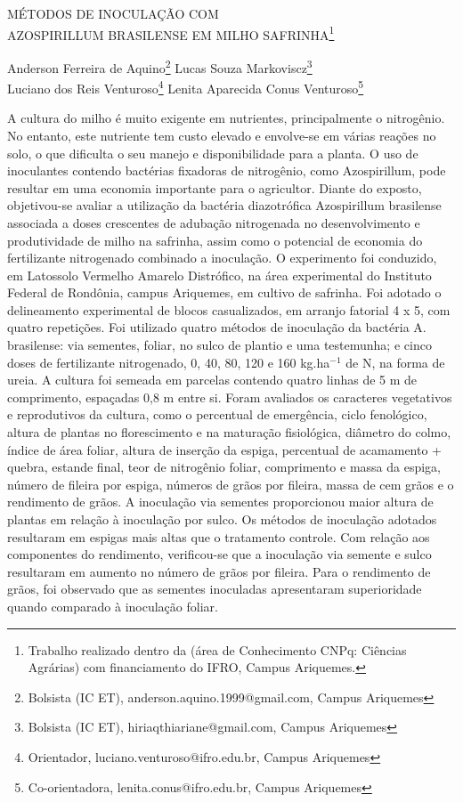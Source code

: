\documentclass[article,12pt,onesidea,4paper,english,brazil]{abntex2}
\begin{document}
	
	
	\frenchspacing 
	
	\begin{center}
		\LARGE MÉTODOS DE INOCULAÇÃO COM \\ \MakeUppercase{Azospirillum brasilense} EM MILHO		
		SAFRINHA\footnote{Trabalho realizado dentro da (área de Conhecimento CNPq: Ciências Agrárias) com financiamento
			do IFRO, Campus Ariquemes.}
		
		\normalsize
		Anderson Ferreira de Aquino\footnote{Bolsista (IC ET), anderson.aquino.1999@gmail.com, Campus Ariquemes} 
		Lucas Souza Markoviscz\footnote{Bolsista (IC ET), hiriaqthiariane@gmail.com, Campus Ariquemes} \\
		Luciano dos Reis Venturoso\footnote{Orientador, luciano.venturoso@ifro.edu.br, Campus Ariquemes} 
		Lenita Aparecida Conus Venturoso\footnote{Co-orientadora, lenita.conus@ifro.edu.br, Campus Ariquemes} 
	\end{center}
	
	\noindent A cultura do milho é muito exigente em nutrientes, principalmente o nitrogênio. No
	entanto, este nutriente tem custo elevado e envolve-se em várias reações no solo, o
	que dificulta o seu manejo e disponibilidade para a planta. O uso de inoculantes
	contendo bactérias fixadoras de nitrogênio, como Azospirillum, pode resultar em
	uma economia importante para o agricultor. Diante do exposto, objetivou-se avaliar a
	utilização da bactéria diazotrófica Azospirillum brasilense associada a doses
	crescentes de adubação nitrogenada no desenvolvimento e produtividade de milho
	na safrinha, assim como o potencial de economia do fertilizante nitrogenado
	combinado a inoculação. O experimento foi conduzido, em Latossolo Vermelho
	Amarelo Distrófico, na área experimental do Instituto Federal de Rondônia, campus
	Ariquemes, em cultivo de safrinha. Foi adotado o delineamento experimental de
	blocos casualizados, em arranjo fatorial 4 x 5, com quatro repetições. Foi utilizado
	quatro métodos de inoculação da bactéria A. brasilense: via sementes, foliar, no
	sulco de plantio e uma testemunha; e cinco doses de fertilizante nitrogenado, 0, 40,
	80, 120 e 160 kg.ha$^{-1}$ de N, na forma de ureia. A cultura foi semeada em parcelas
	contendo quatro linhas de 5 m de comprimento, espaçadas 0,8 m entre si. Foram
	avaliados os caracteres vegetativos e reprodutivos da cultura, como o percentual de
	emergência, ciclo fenológico, altura de plantas no florescimento e na maturação
	fisiológica, diâmetro do colmo, índice de área foliar, altura de inserção da espiga,
	percentual de acamamento + quebra, estande final, teor de nitrogênio foliar,
	comprimento e massa da espiga, número de fileira por espiga, números de grãos por
	fileira, massa de cem grãos e o rendimento de grãos. A inoculação via sementes
	proporcionou maior altura de plantas em relação à inoculação por sulco. Os métodos
	de inoculação adotados resultaram em espigas mais altas que o tratamento controle.
	Com relação aos componentes do rendimento, verificou-se que a inoculação via
	semente e sulco resultaram em aumento no número de grãos por fileira. Para o
	rendimento de grãos, foi observado que as sementes inoculadas apresentaram
	superioridade quando comparado à inoculação foliar.
	
\end{document}
